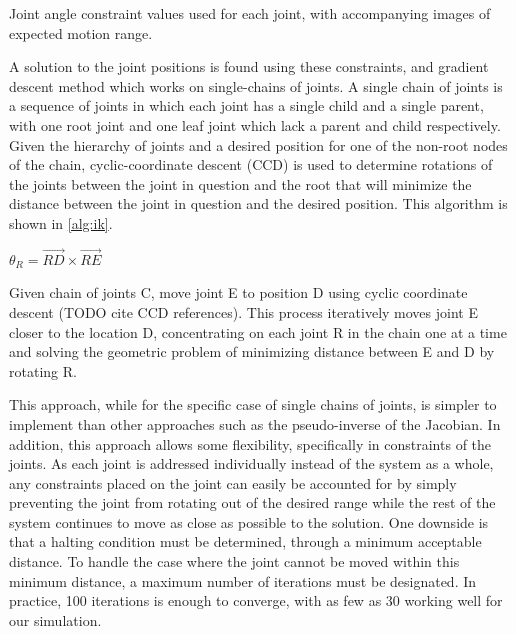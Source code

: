 
\begin{table}[ht]
	\centering
	\caption[Table of joint constraints]{Joint angle constraint values used for each joint, with accompanying images of expected motion range.}
	\label{tab:jointConstraints}
\end{table}

A solution to the joint positions is found using these constraints, and gradient descent method which works on single-chains of joints.  A single chain of joints is a sequence of joints in which each joint has a single child and a single parent, with one root joint and one leaf joint which lack a parent and child respectively.  Given the hierarchy of joints and a desired position for one of the non-root nodes of the chain, cyclic-coordinate descent (CCD) is used to determine rotations of the joints between the joint in question and the root that will minimize the distance between the joint in question and the desired position.  This algorithm is shown in \ref{alg:ik}.

\begin{algorithm}[ht]
	\centering
	\begin{algorithmic}[H]
		\Repeat
			\State $\theta_R = \vec{RD} \times \vec{RE}$
		\EndFor
		\EndFunction
	\end{algorithmic}
	\caption[Single chain IK algorithm]{Given chain of joints C, move joint E to position D using cyclic coordinate descent (TODO cite CCD references).  This process iteratively moves joint E closer to the location D, concentrating on each joint R in the chain one at a time and solving the geometric problem of minimizing distance between E and D by rotating R.}
	\label{alg:ik}
\end{algorithm}

This approach, while for the specific case of single chains of joints, is simpler to implement than other approaches such as the pseudo-inverse of the Jacobian.  In addition, this approach allows some flexibility, specifically in constraints of the joints.  As each joint is addressed individually instead of the system as a whole, any constraints placed on the joint can easily be accounted for by simply preventing the joint from rotating out of the desired range while the rest of the system continues to move as close as possible to the solution.  One downside is that a halting condition must be determined, through a minimum acceptable distance.  To handle the case where the joint cannot be moved within this minimum distance, a maximum number of iterations must be designated.  In practice, 100 iterations is enough to converge, with as few as 30 working well for our simulation.

